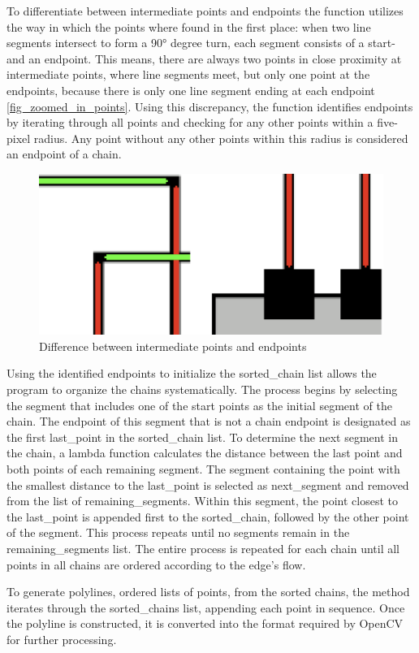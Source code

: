 To differentiate between intermediate points and endpoints the function utilizes the way in which the points where found in the first place: when two line segments intersect to form a 90° degree turn, each segment consists of a start- and an endpoint. This means, there are always two points in close proximity at intermediate points, where line segments meet, but only one point at the endpoints, because there is only one line segment ending at each endpoint \ref{fig_zoomed_in_points}.
Using this discrepancy, the function identifies endpoints by iterating through all points and checking for any other points within a five-pixel radius. Any point without any other points within this radius is considered an endpoint of a chain.\\
\begin{figure}
    \centering
    \includegraphics[width=0.5\linewidth]{Pictures/zoomed_in_points.png}
    \caption{Difference between intermediate points and endpoints}
    \label{fig_point_zoom}
\end{figure}
Using the identified endpoints to initialize the sorted\_chain list allows the program to organize the chains systematically. The process begins by selecting the segment that includes one of the start points as the initial segment of the chain. The endpoint of this segment that is not a chain endpoint is designated as the first last\_point in the sorted\_chain list. To determine the next segment in the chain, a lambda function calculates the distance between the last point and both points of each remaining segment. The segment containing the point with the smallest distance to the last\_point is selected as next\_segment and removed from the list of remaining\_segments. Within this segment, the point closest to the last\_point is appended first to the sorted\_chain, followed by the other point of the segment. This process repeats until no segments remain in the remaining\_segments list. The entire process is repeated for each chain until all points in all chains are ordered according to the edge's flow.

To generate polylines, ordered lists of points, from the sorted chains, the method iterates through the sorted\_chains list, appending each point in sequence. Once the polyline is constructed, it is converted into the format required by OpenCV for further processing.
